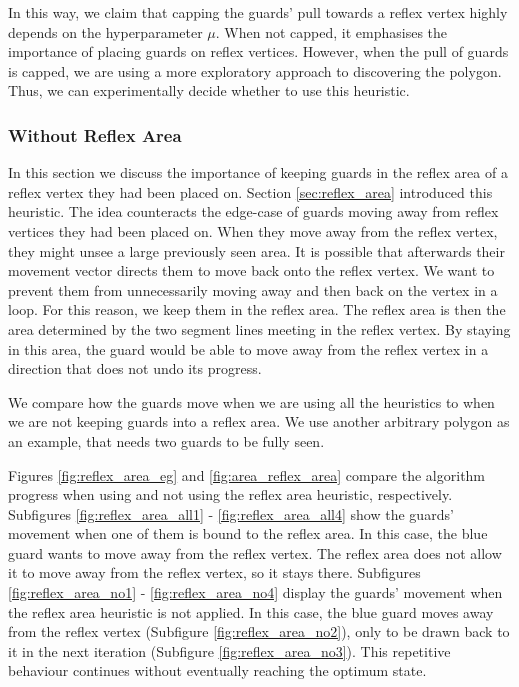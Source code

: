 In this way, we claim that capping the guards' pull towards a reflex vertex highly depends on the hyperparameter $\mu$. When not capped, it emphasises the importance of placing guards on reflex vertices. However, when the pull of guards is capped, we are using a more exploratory approach to discovering the polygon. Thus, we can experimentally decide whether to use this heuristic. 

\newpage
\subsubsection{Without Reflex Area}
In this section we  discuss the importance of keeping guards in the reflex area of a reflex vertex they had been placed on. Section \ref{sec:reflex_area} introduced this heuristic. The idea counteracts the edge-case of guards moving away from reflex vertices they had been placed on. When they move away from the reflex vertex, they might unsee a large previously seen area. It is possible that afterwards their movement vector directs them to move back onto the reflex vertex. We want to prevent them from unnecessarily moving away and then back on the vertex in a loop. For this reason, we  keep them in the reflex area. The reflex area is then the area determined by the two segment lines meeting in the reflex vertex. By staying in this area, the guard would be able to move away from the reflex vertex in a direction that does not undo its progress.

We  compare how the guards move when we are using all the heuristics to when we are not keeping guards into a reflex area. We  use another arbitrary polygon as an example, that needs two guards to be fully seen.

Figures \ref{fig:reflex_area_eg} and \ref{fig:area_reflex_area} compare the algorithm progress when using and not using the reflex area heuristic, respectively. Subfigures \ref{fig:reflex_area_all1} - \ref{fig:reflex_area_all4} show the guards' movement when one of them is bound to the reflex area. In this case, the blue guard wants to move away from the reflex vertex. The reflex area does not allow it to move away from the reflex vertex, so it stays there. 
Subfigures \ref{fig:reflex_area_no1} - \ref{fig:reflex_area_no4} display the guards' movement when the reflex area heuristic is not applied. In this case, the blue guard moves away from the reflex vertex (Subfigure \ref{fig:reflex_area_no2}), only to be drawn back to it in the next iteration (Subfigure \ref{fig:reflex_area_no3}). This repetitive behaviour continues without eventually reaching the optimum state.

